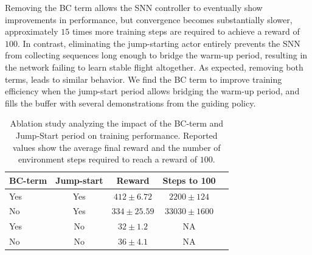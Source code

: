 Removing the BC term allows the SNN controller to eventually show improvements in performance, but convergence becomes substantially slower, approximately $15$ times more training steps are required to achieve a reward of $100$. In contrast, eliminating the jump-starting actor entirely prevents the SNN from collecting sequences long enough to bridge the warm-up period, resulting in the network failing to learn stable flight altogether. As expected, removing both terms, leads to similar behavior. We find the BC term to improve training efficiency when the jump-start period allows bridging the warm-up period, and fills the buffer with several demonstrations from the guiding policy.
\begin{table}[h!]
\centering
\caption{Ablation study analyzing the impact of the BC-term and Jump-Start period on training performance. Reported values show the average final reward and the number of environment steps required to reach a reward of $100$.}
\label{tab:ablation}
\begin{tabular}{lcccc}
\toprule
\textbf{BC-term} & \textbf{Jump-start}  & \textbf{Reward} & \textbf{Steps to 100} \\
\midrule
Yes & Yes &  $412 \pm 6.72$ & $2200 \pm 124$  \\
No & Yes & $334 \pm 25.59$ & $33030 \pm 1600$ \\
Yes & No & $32 \pm 1.2$ &  NA\\
No & No & $36 \pm 4.1$  & NA \\
\bottomrule
\end{tabular}
\end{table}
